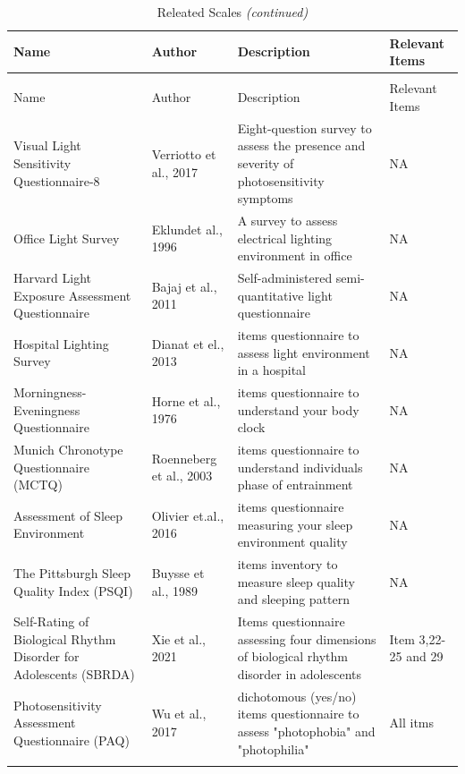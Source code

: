 \documentclass[
  english,
  man]{apa6}
\begin{document}
\begin{longtable}[t]{>{\raggedright\arraybackslash}p{4cm}>{\raggedright\arraybackslash}p{4cm}>{\raggedright\arraybackslash}p{4cm}>{\raggedright\arraybackslash}p{4cm}}
\caption{\label{tab:unnamed-chunk-2}Releated Scales}\\
\toprule
Name & Author & Description & Relevant Items\\
\midrule
\endfirsthead
\caption[]{\label{tab:unnamed-chunk-2}Releated Scales \textit{(continued)}}\\
\toprule
Name & Author & Description & Relevant Items\\
\midrule
\endhead

\endfoot
\bottomrule
\endlastfoot
Visual Light Sensitivity Questionnaire-8 & Verriotto et al., 2017 & Eight-question survey to assess the presence and severity of photosensitivity symptoms & NA\\
Office Light Survey & Eklundet al., 1996 & A survey to assess electrical lighting environment in office & NA\\
Harvard Light Exposure Assessment Questionnaire & Bajaj et al., 2011 & Self-administered semi-quantitative light questionnaire & NA\\
Hospital Lighting Survey & Dianat et el., 2013 & 23 items questionnaire to assess light environment in a hospital & NA\\
Morningness-Eveningness Questionnaire & Horne et al., 1976 & 19 items questionnaire to understand your body clock & NA\\
\addlinespace
Munich Chronotype Questionnaire (MCTQ) & Roenneberg et al., 2003 & 17 items questionnaire to understand individuals phase of entrainment & NA\\
Assessment of Sleep Environment & Olivier et.al., 2016 & 13 items questionnaire measuring your sleep environment quality & NA\\
The Pittsburgh Sleep Quality Index (PSQI) & Buysse et al., 1989 & 9 items inventory to measure sleep quality and sleeping pattern & NA\\
Self-Rating of Biological Rhythm Disorder for Adolescents (SBRDA) & Xie et al., 2021 & 29 Items questionnaire assessing four dimensions of biological rhythm disorder in adolescents & Item 3,22-25 and 29\\
Photosensitivity Assessment Questionnaire (PAQ) & Wu et al., 2017 & 16 dichotomous (yes/no) items questionnaire to assess "photophobia" and "photophilia" & All itms\\*
\end{longtable}
\end{document}

